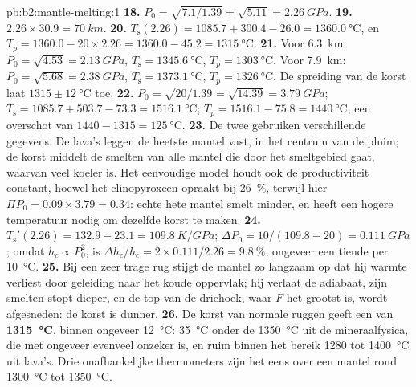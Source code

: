 \begin{solution}{pb:b2:mantle-melting:1}
\textbf{18.} $P_0 = \sqrt{7.1/1.39} = \sqrt{5.11} = \qty{2.26}{GPa}$.
\textbf{19.} $2.26\times30.9 = \qty{70}{km}$.
\textbf{20.} $T_{\mathrm s}(2.26) = 1085.7 + 300.4 - 26.0 = \qty{1360.0}{\celsius}$,
en $T_p = 1360.0 - 20\times2.26 = 1360.0 - 45.2 = \qty{1315}{\celsius}$.
\textbf{21.} Voor \qty{6.3}{km}: $P_0 = \sqrt{4.53} = \qty{2.13}{GPa}$, $T_{\mathrm s}
= \qty{1345.6}{\celsius}$, $T_p = \qty{1303}{\celsius}$. Voor \qty{7.9}{km}: $P_0 =
\sqrt{5.68} = \qty{2.38}{GPa}$, $T_{\mathrm s} = \qty{1373.1}{\celsius}$, $T_p =
\qty{1326}{\celsius}$. De spreiding van de korst laat $1315 \pm
\qty{12}{\celsius}$ toe.
\textbf{22.} $P_0 = \sqrt{20/1.39} = \sqrt{14.39} = \qty{3.79}{GPa}$; $T_{\mathrm s} =
1085.7 + 503.7 - 73.3 = \qty{1516.1}{\celsius}$; $T_p = 1516.1 - 75.8 =
\qty{1440}{\celsius}$, een overschot van $1440 - 1315 = \qty{125}{\celsius}$.
\textbf{23.} De twee gebruiken verschillende gegevens. De lava's leggen de heetste mantel vast,
in het centrum van de pluim; de korst middelt de smelten van alle mantel die
door het smeltgebied gaat, waarvan veel koeler is. Het eenvoudige model houdt ook
de productiviteit constant, hoewel het clinopyroxeen opraakt bij \qty{26}{\percent},
terwijl hier $\Pi P_0 = 0.09\times3.79 = 0.34$: echte hete mantel smelt minder, en heeft
een hogere temperatuur nodig om dezelfde korst te maken.
\textbf{24.} $T_{\mathrm s}'(2.26) = 132.9 - 23.1 = \qty{109.8}{K/GPa}$; $\Delta P_0 =
10/(109.8 - 20) = \qty{0.111}{GPa}$; omdat $h_c \propto P_0^2$, is $\Delta h_c/h_c =
2\times0.111/2.26 = \qty{9.8}{\percent}$, ongeveer een tiende per \qty{10}{\celsius}.
\textbf{25.} Bij een zeer trage rug stijgt de mantel zo langzaam op dat hij warmte verliest door
geleiding naar het koude oppervlak; hij verlaat de adiabaat, zijn smelten stopt
dieper, en de top van de driehoek, waar $F$ het grootst is, wordt afgesneden: de korst is
dunner.
\textbf{26.} De korst van normale ruggen geeft een  van
\textbf{\qty[text-series-to-math=true]{1315}{\celsius}}, binnen ongeveer
\qty{12}{\celsius}: \qty{35}{\celsius} onder de \qty{1350}{\celsius} uit de
mineraalfysica, die met ongeveer evenveel onzeker is, en ruim binnen het bereik 1280 tot
\qty{1400}{\celsius} uit lava's. Drie onafhankelijke thermometers zijn het eens over een mantel
rond \qty{1300}{\celsius} tot \qty{1350}{\celsius}.
\end{solution}
